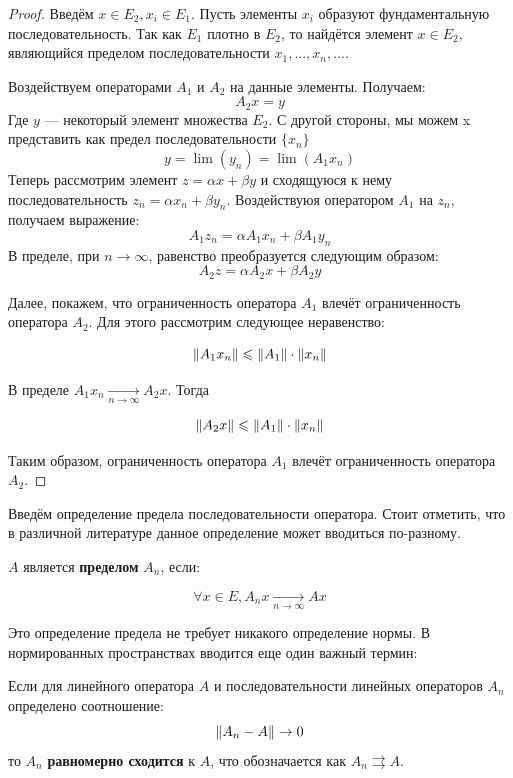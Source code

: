 	\begin{proof}
		Введём $x \in E_2, x_i \in E_1$. Пусть элементы $x_i$ образуют фундаментальную последовательность. Так как $E_1$ плотно в $E_2$,
		то найдётся элемент $x \in E_2$, являющийся пределом последовательности $x_1, ..., x_n, ...$.
		
		Воздействуем операторами $A_1$ и $A_2$ на данные элементы. Получаем:
		$$A_2 x = y$$ 
		Где $y$ --- некоторый элемент множества $E_2$. С другой стороны, мы можем x представить как предел последовательности $\{x_n\}$
		$$y = \lim (y_n) = \lim(A_1 x_n)$$
		Теперь рассмотрим элемент $z = \alpha x + \beta y$ и сходящуюся к нему последовательность $z_n = \alpha x_n + \beta y_n$.
		Воздействуюя оператором $A_1$ на $z_n$, получаем выражение:
		$$A_1 z_n = \alpha A_1 x_n + \beta A_1 y_n$$
		В пределе, при $n \rightarrow \infty$, равенство преобразуется следующим образом:
		$$A_2 z = \alpha A_2 x + \beta A_2 y$$
		
		Далее, покажем, что ограниченность оператора $A_1$ влечёт ограниченность оператора $A_2$. Для этого рассмотрим следующее 
		неравенство:
		
		$$\| A_1 x_n \| \leqslant \| A_1 \| \cdot \| x_n \|$$
		
		В пределе $A_1 x_n \underset{n \rightarrow \infty}{\rightarrow} A_2 x$. Тогда
		
		$$\| A_2 x \| \leqslant \| A_1 \| \cdot \| x_n \|$$
		
		Таким образом, ограниченность оператора $A_1$ влечёт ограниченность оператора $A_2$.
	\end{proof}
	
	Введём определение предела последовательности оператора. Стоит отметить, что в различной литературе данное определение может вводиться
	по-разному.
	
	\begin{defi}
		$A$ является \textbf{пределом} $A_n$, если:
		
		$$\forall x \in E, A_n x \underset{n \rightarrow \infty}{\rightarrow} A x$$
	\end{defi}
	Это определение предела не требует никакого определение нормы. В нормированных пространствах вводится еще один 
	важный термин:
	
	\begin{defi}
		Если для линейного оператора $A$ и последовательности линейных операторов $A_n$ определено соотношение:
		$$\| A_n - A \| \rightarrow 0$$
		то $A_n$ \textbf{равномерно сходится} к $A$, что обозначается как $A_n \rightrightarrows A$.
	\end{defi}
	
